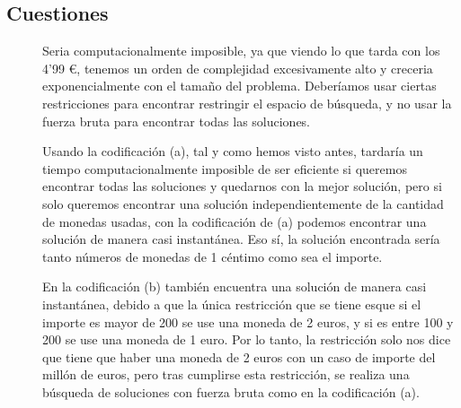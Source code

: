 \documentclass{article}
\begin{document}
\newpage
\subsection{Cuestiones}
\begin{description}
  \item[\begin{tabular}{p{15cm}}{¿Qué ocurriría si, usando la
  codificación (a) para encontrar todas las soluciones, el importe buscado es mucho
  mayor?}\end{tabular}]
    Seria computacionalmente imposible, ya que viendo lo que tarda con los 4'99 {\euro}, tenemos un 
    orden de complejidad excesivamente alto y creceria exponencialmente con el tamaño del problema.
    Deberíamos usar ciertas restricciones para encontrar restringir el espacio de búsqueda, y no 
    usar la fuerza bruta para encontrar todas las soluciones.

  \item [\begin{tabular}{p{15cm}}{¿Se podría encontrar alguna solución (usando la codificación de (a) o cualquier
  otra) de este problema con un importe del orden de los millones de euros?}\end{tabular}]
    Usando la codificación (a), tal y como hemos visto antes, tardaría un tiempo computacionalmente imposible de ser
    eficiente si queremos encontrar todas las soluciones y quedarnos con la mejor solución, pero si solo queremos encontrar
    una solución independientemente de la cantidad de monedas usadas, con la codificación de (a) podemos encontrar una solución
    de manera casi instantánea. Eso sí, la solución encontrada sería tanto números de monedas de 1 céntimo como sea el importe.

    En la codificación (b) también encuentra una solución de manera casi instantánea, debido a que la única restricción 
    que se tiene esque si el importe es mayor de 200 se use una moneda de 2 euros, y si es entre 100 y 200 se use una moneda de 1 euro.
    Por lo tanto, la restricción solo nos dice que tiene que haber una moneda de 2 euros con un caso de importe del millón de euros, pero tras 
    cumplirse esta restricción, se realiza una búsqueda de soluciones con fuerza bruta como en la codificación (a).


\end{description}
\end{document}
